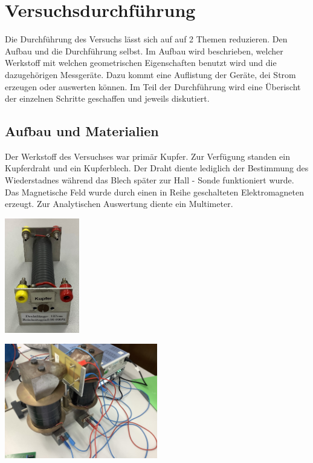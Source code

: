 \section{Versuchsdurchführung} 
\label{sec:versuchdurchführung}
Die Durchführung des Versuchs lässt sich auf auf 2 Themen reduzieren. Den Aufbau %
und die Durchführung %
selbst. Im Aufbau wird beschrieben, 
welcher Werkstoff mit welchen geometrischen Eigenschaften benutzt wird und die dazugehörigen Messgeräte. Dazu kommt eine Auflistung der  Geräte, dei Strom erzeugen oder 
auswerten können. Im Teil der Durchführung %
wird eine Überischt der einzelnen Schritte geschaffen und jeweils diskutiert.


\subsection{Aufbau und Materialien}
\label{sec:Aufbau}
Der Werkstoff des Versuchses war primär Kupfer. Zur Verfügung standen ein Kupferdraht und ein Kupferblech. Der Draht diente lediglich der Bestimmung des Wiederstadnes während 
das Blech später zur Hall - Sonde funktioniert wurde. 
Das Magnetische Feld wurde durch einen in Reihe geschalteten Elektromagneten erzeugt. Zur Analytischen Auswertung diente ein Multimeter.\\


\begin{minipage}{0.5\textwidth}
\centering
\includegraphics[height=5cm]{bilder/Kupferdraht.png}
\label{fig:Kupferdraht}
\end{minipage}
\hfill
\begin{minipage}{0.5\textwidth} 
\centering
\includegraphics[height=5cm]{bilder/Magnet.png}
\label{fig:Magnet}
\end{minipage}

